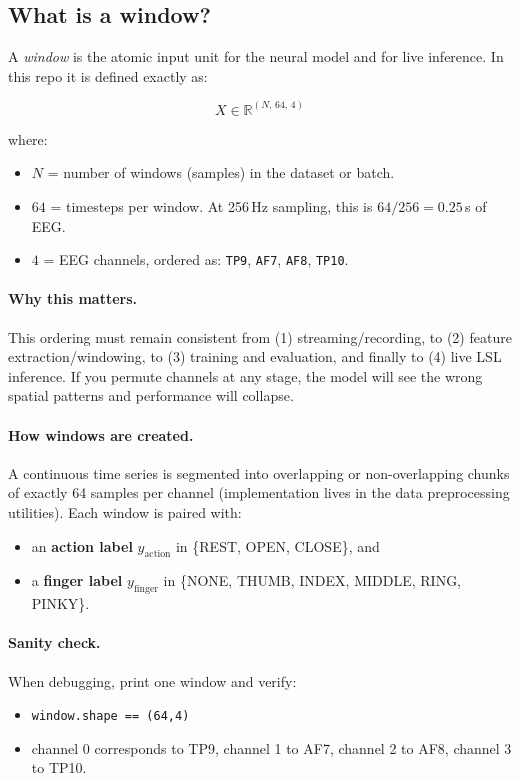 \documentclass[11pt]{article}
\begin{document}
\subsection{What is a window?}
A \emph{window} is the atomic input unit for the neural model and for live inference. In this repo it is defined exactly as:

\[
X \in \mathbb{R}^{(N,\,64,\,4)}
\]

where:

\begin{itemize}
  \item $N$ = number of windows (samples) in the dataset or batch.
  \item $64$ = timesteps per window. At 256\,Hz sampling, this is $64/256 = 0.25$\,s of EEG.
  \item $4$ = EEG channels, ordered as: \texttt{TP9}, \texttt{AF7}, \texttt{AF8}, \texttt{TP10}.
\end{itemize}

\paragraph{Why this matters.}
This ordering must remain consistent from (1) streaming/recording, to (2) feature extraction/windowing, to (3) training and evaluation, and finally to (4) live LSL inference. If you permute channels at any stage, the model will see the wrong spatial patterns and performance will collapse.

\paragraph{How windows are created.}
A continuous time series is segmented into overlapping or non-overlapping chunks of exactly 64 samples per channel (implementation lives in the data preprocessing utilities). Each window is paired with:
\begin{itemize}
  \item an \textbf{action label} $y_\text{action}$ in \{REST, OPEN, CLOSE\}, and
  \item a \textbf{finger label} $y_\text{finger}$ in \{NONE, THUMB, INDEX, MIDDLE, RING, PINKY\}.
\end{itemize}

\paragraph{Sanity check.} When debugging, print one window and verify:
\begin{itemize}
  \item \texttt{window.shape == (64,4)}
  \item channel 0 corresponds to TP9, channel 1 to AF7, channel 2 to AF8, channel 3 to TP10.
\end{itemize}
\end{document}
